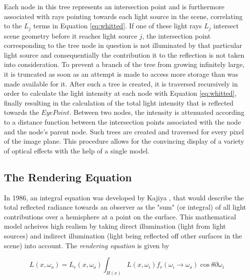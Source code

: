 Each node in this tree represents an intersection point and is furthermore associated with rays pointing towards  each light source in the scene, correlating to the $L_{j}$ terms in Equation \ref{eq:whitted}. If one of these light rays $L_{j}$ intersect scene geometry before it reaches light source $j$, the intersection point corresponding to the tree node in question is not illuminated by that particular light source and consequentially the contribution it to the reflection is not taken into consideration. To prevent a branch of the tree from growing infinitely large, it is truncated as soon as an attempt is made to access more storage than was made available for it. After such a tree is created, it is traversed recursively in order to calculate the light intensity at each node with Equation \ref{eq:whitted}, finally resulting in the calculation of the total light intensity that is reflected towards the $Eye Point$. Between two nodes, the intensity is attenuated according to a distance function between the intersection points associated with the node and the node's parent node. 
Such trees are created and traversed for every pixel of the image plane. This procedure allows for the convincing display of a variety of optical effects with the help of a single model.


\subsection{The Rendering Equation}

In 1986, an integral equation was developed by Kajiya \cite{kajiya1986rendering}, that would describe the total reflected radiance towards an observer as the "sum" (or integral) of all light contributions over a hemisphere at a point on the surface. This mathematical model acheives high realism by taking direct illumination (light from light sources) and indirect illumination (light being reflected off other surfaces in the scene) into account.
The \emph{rendering equation} is given by

\begin{equation}\label{eq:renderingeq}
L(x, \omega_{o}) = L_{e}(x, \omega_{o}) \int_{H(x)} L(x, \omega_{i})f_{r}(\omega_{i} \rightarrow \omega_{o})\cos\theta\partial\omega_{i}
\end{equation}

